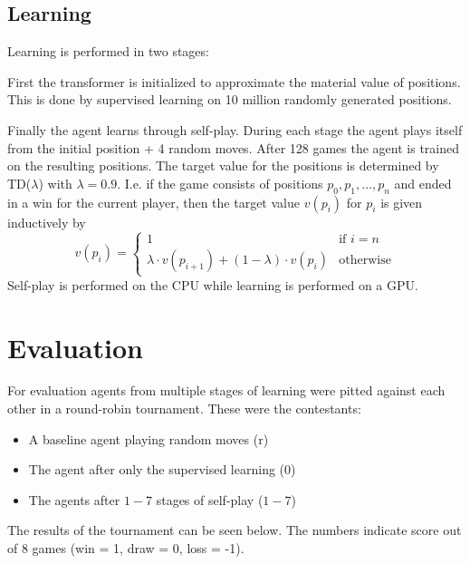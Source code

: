 \documentclass[a4paper,12pt]{article}
\theoremstyle{definition}
\theoremstyle{definition}
\theoremstyle{definition}
\theoremstyle{definition}
\theoremstyle{definition}
\theoremstyle{definition}
\begin{document}
	\subsection{Learning}

	Learning is performed in two stages:
	
	First the transformer is initialized to approximate the material value of positions. This is done by supervised learning on 10 million randomly generated positions.
	
	Finally the agent learns through self-play. During each stage the agent plays itself from the initial position + 4 random moves. After 128 games the agent is trained on the resulting positions. The target value for the positions is determined by TD($\lambda$) with $\lambda = 0.9$. I.e. if the game consists of positions $p_0,p_1,\ldots,p_n$ and ended in a win for the current player, then the target value $v(p_i)$ for $p_i$ is given inductively by
	$$v(p_i) = \begin{cases}
	1 & \text{if } i = n\\
	\lambda\cdot v(p_{i+1}) + (1-\lambda)\cdot v(p_{i}) & \text{otherwise}
	\end{cases}$$
	Self-play is performed on the CPU while learning is performed on a GPU.
	
	\section{Evaluation}
	
	For evaluation agents from multiple stages of learning were pitted against each other in a round-robin tournament. These were the contestants:
	\begin{itemize}
		\item A baseline agent playing random moves (r)
		\item The agent after only the supervised learning ($0$)
		\item The agents after $1-7$ stages of self-play ($1-7$)
	\end{itemize}

	The results of the tournament can be seen below. The numbers indicate score out of 8 games (win = 1, draw = 0, loss = -1).

	\newcommand{\loss}[1]{\cellcolor{yellow!\fpeval{100*#1/8}}-#1}
	\newcommand{\win}[1]{\cellcolor{blue!\fpeval{50*#1/8}}#1}
\end{document}
